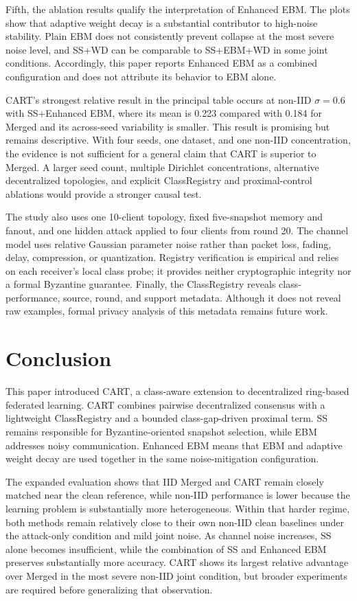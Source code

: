 \documentclass[conference]{IEEEtran}
\begin{document}
Fifth, the ablation results qualify the interpretation of Enhanced EBM. The plots show that adaptive weight decay is a substantial contributor to high-noise stability. Plain EBM does not consistently prevent collapse at the most severe noise level, and SS+WD can be comparable to SS+EBM+WD in some joint conditions. Accordingly, this paper reports Enhanced EBM as a combined configuration and does not attribute its behavior to EBM alone.

CART's strongest relative result in the principal table occurs at non-IID $\sigma=0.6$ with SS+Enhanced EBM, where its mean is 0.223 compared with 0.184 for Merged and its across-seed variability is smaller. This result is promising but remains descriptive. With four seeds, one dataset, and one non-IID concentration, the evidence is not sufficient for a general claim that CART is superior to Merged. A larger seed count, multiple Dirichlet concentrations, alternative decentralized topologies, and explicit ClassRegistry and proximal-control ablations would provide a stronger causal test.

The study also uses one 10-client topology, fixed five-snapshot memory and fanout, and one hidden attack applied to four clients from round 20. The channel model uses relative Gaussian parameter noise rather than packet loss, fading, delay, compression, or quantization. Registry verification is empirical and relies on each receiver's local class probe; it provides neither cryptographic integrity nor a formal Byzantine guarantee. Finally, the ClassRegistry reveals class-performance, source, round, and support metadata. Although it does not reveal raw examples, formal privacy analysis of this metadata remains future work.

\section{Conclusion}

This paper introduced CART, a class-aware extension to decentralized ring-based federated learning. CART combines pairwise decentralized consensus with a lightweight ClassRegistry and a bounded class-gap-driven proximal term. SS remains responsible for Byzantine-oriented snapshot selection, while EBM addresses noisy communication. Enhanced EBM means that EBM and adaptive weight decay are used together in the same noise-mitigation configuration.

The expanded evaluation shows that IID Merged and CART remain closely matched near the clean reference, while non-IID performance is lower because the learning problem is substantially more heterogeneous. Within that harder regime, both methods remain relatively close to their own non-IID clean baselines under the attack-only condition and mild joint noise. As channel noise increases, SS alone becomes insufficient, while the combination of SS and Enhanced EBM preserves substantially more accuracy. CART shows its largest relative advantage over Merged in the most severe non-IID joint condition, but broader experiments are required before generalizing that observation.



\end{document}
